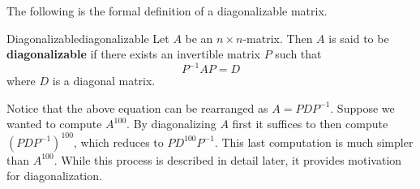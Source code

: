 The following is the formal definition of a diagonalizable matrix. 

\begin{definition}{Diagonalizable}{diagonalizable}
Let $A$ be an $n\times n$-matrix. Then $A$ is said to be \textbf{diagonalizable} if there exists an invertible matrix $P$ such that
\begin{equation*}
P^{-1}AP=D
\end{equation*}
where $D$ is a diagonal matrix.
\end{definition}

Notice that the above equation can be rearranged as $A=PDP^{-1}$. Suppose we wanted to compute $A^{100}$. By diagonalizing $A$ first it suffices to then compute $(PDP^{-1})^{100}$, which reduces to $PD^{100}P^{-1}$. This last computation is much simpler than $A^{100}$. While this process is described in detail later, it provides motivation for diagonalization. 
